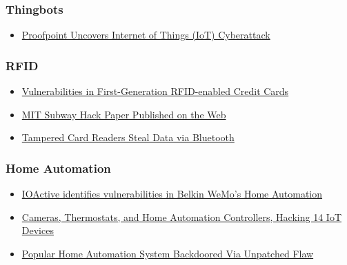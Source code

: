 \hypertarget{thingbots}{%
\subsubsection{Thingbots}\label{thingbots}}

\begin{itemize}
\tightlist
\item
  \href{http://investors.proofpoint.com/releasedetail.cfm?releaseid=819799}{Proofpoint
  Uncovers Internet of Things (IoT) Cyberattack}
\end{itemize}

\hypertarget{rfid}{%
\subsubsection{RFID}\label{rfid}}

\begin{itemize}
\tightlist
\item
  \href{http://www.arijuels.com/wp-content/uploads/2013/09/HBFJ+07.pdf}{Vulnerabilities
  in First-Generation RFID-enabled Credit Cards}
\item
  \href{http://www.pcmag.com/article2/0,2817,2327898,00.asp}{MIT Subway
  Hack Paper Published on the Web}
\item
  \href{http://www.americanbanker.com/security-watch/bluetooth-skimming-1042020-1.html}{Tampered
  Card Readers Steal Data via Bluetooth}
\end{itemize}

\hypertarget{home-automation}{%
\subsubsection{Home Automation}\label{home-automation}}

\begin{itemize}
\tightlist
\item
  \href{http://www.ioactive.com/pdfs/IOActive_Belkin-advisory-lite.pdf}{IOActive
  identifies vulnerabilities in Belkin WeMo's Home Automation}
\item
  \href{https://www.iotvillage.org/slides_DC23/IoT11-slides.pdf}{Cameras,
  Thermostats, and Home Automation Controllers, Hacking 14 IoT Devices}
\item
  \href{http://www.darkreading.com/vulnerabilities---threats/popular-home-automation-system-backdoored-via-unpatched-flaw/d/d-id/1320004?_mc=sm_dr_editor_kellyjacksonhiggins}{Popular
  Home Automation System Backdoored Via Unpatched Flaw}
\end{itemize}

